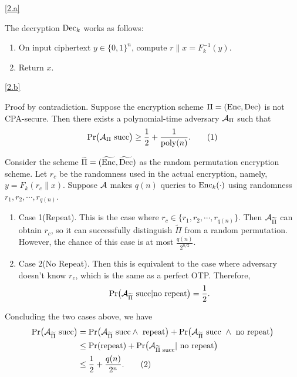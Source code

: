 \documentclass{homework}
\begin{document}
\begin{solution}

  \ref{2.a}

  The decryption $\mathrm{Dec}_{k}$ works as follows:
  \begin{enumerate}
    \item On input ciphertext $y \in {\{0,1\}}^{n}$, compute $r \| x = F^{-1}_{k}(y)$.
    \item Return $x$.
  \end{enumerate}

  \ref{2.b}

  Proof by contradiction. Suppose the encryption scheme $\Pi = (\mathrm{Enc}, \mathrm{Dec})$
  is not CPA-secure. Then there exists a polynomial-time adversary
  $\mathcal{A}_{\Pi}$ such that
  \begin{equation*}
    \Pr \bigl(\mathcal{A}_{\Pi} \text{ succ} \bigr)
    \ge \frac{1}{2} + \frac{1}{\mathrm{poly}(n)}. \tag{1}
  \end{equation*}

  Consider the scheme $\widetilde{\Pi} = (\widetilde{\mathrm{Enc}}, \widetilde{\mathrm{Dec}})$ as the random
  permutation encryption scheme. Let $r_c$ be the randomness used in the actual
  encryption, namely, $y = F_k(r_c \| x)$. Suppose $\mathcal{A}$ makes $q(n)$ queries to $\mathrm{Enc}_k(\cdot)$
  using randomness $r_1, r_2, \cdots, r_{q(n)}$.

  \begin{enumerate}
    \item Case 1(Repeat). This is the case where $r_c \in \{r_1, r_2, \cdots, r_{q(n)}\}$.
          Then $\mathcal{A}_{\widetilde{\Pi}}$ can obtain $r_c$, so it can successfully
          distinguish $\widetilde{\Pi}$ from a random permutation. However,
          the chance of this case is at most $\frac{q(n)}{2^{n/2}}$.
    \item Case 2(No Repeat). Then this is equivalent to the case where adversary
          doesn't know $r_c$, which is the same as a perfect OTP. Therefore,
          \begin{equation*}
            \Pr \bigl(\mathcal{A}_{\widetilde{\Pi}} \text{ succ} | \text{no repeat} \bigr)
            = \frac{1}{2}.
          \end{equation*}
  \end{enumerate}

  Concluding the two cases above, we have
  \begin{align*}
    \Pr \bigl( \mathcal{A}_{\widetilde{\Pi}} \text{ succ} \bigr)
    & = \Pr \bigl(\mathcal{A}_{\widetilde{\Pi}} \text{ succ} \land
      \text{ repeat} \bigr) + \Pr \bigl(\mathcal{A}_{\widetilde{\Pi}} \text{ succ }
      \land \text{ no repeat} \bigr) \\
    & \le \Pr (\text{repeat}) +
      \Pr \bigl(\mathcal{A}_{\widetilde{\Pi} \text{ succ}} | \text{ no
      repeat} \bigr) \\
    & \le \frac{1}{2} + \frac{q(n)}{2^n}. \tag{2}
  \end{align*}


\end{solution}
\end{document}
